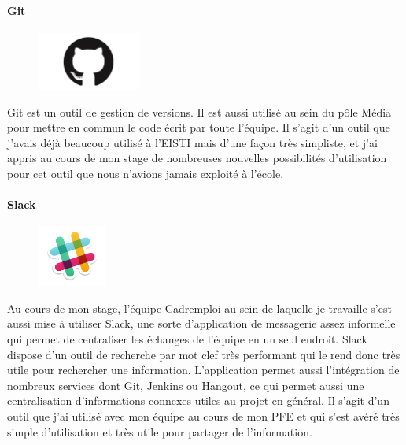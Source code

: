 \paragraph{Git}
\label{par:Git}
\begin{figure}
  \begin{center}
    \includegraphics[width=0.30\textwidth]{Pictures/git_logo.jpg}
  \end{center}
\end{figure}
Git est un outil de gestion de versions.
Il est aussi utilisé au sein du pôle Média pour mettre en commun le code écrit par toute l'équipe.
Il s'agit d'un outil que j'avais déjà beaucoup utilisé à l'EISTI mais d'une façon très simpliste, et j'ai appris au cours de mon stage de nombreuses nouvelles possibilités d'utilisation pour cet outil que nous n'avions jamais exploité à l'école.
\paragraph{Slack}
\label{par:Slack}
\begin{figure}
  \begin{center}
    \includegraphics[width=0.20\textwidth]{Pictures/slack_logo.png}
  \end{center}
\end{figure}
Au cours de mon stage, l'équipe Cadremploi au sein de laquelle je travaille s'est aussi mise à utiliser Slack, une sorte d'application de messagerie assez informelle qui permet de centraliser les échanges de l'équipe en un seul endroit.
Slack dispose d'un outil de recherche par mot clef très performant qui le rend donc très utile pour rechercher une information.
L'application permet aussi l'intégration de nombreux services dont Git, Jenkins ou Hangout, ce qui permet aussi une centralisation d'informations connexes utiles au projet en général.
Il s'agit d'un outil que j'ai utilisé avec mon équipe au cours de mon PFE et qui s'est avéré très simple d'utilisation et très utile pour partager de l'information.


